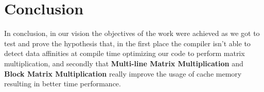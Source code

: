 \section{Conclusion}

In conclusion, in our vision the objectives of the work were achieved as we got to test and prove the hypothesis that, in the first place the compiler isn't able to detect data affinities at compile time optimizing our code to perform matrix multiplication, and secondly that \textbf{Multi-line Matrix Multiplication} and \textbf{Block Matrix Multiplication} really improve the usage of cache memory resulting in better time performance.